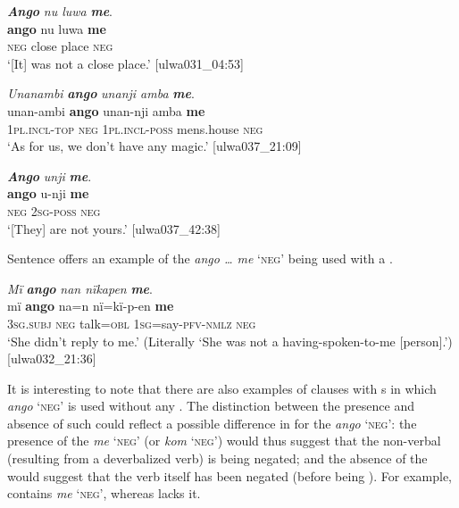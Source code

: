 \newpage

\ea%
    \label{ex:syntax:144}
          \textbf{\textit{Ango}} \textit{nu luwa} \textbf{\textit{me}}.\\
\gll \textbf{ango}  nu    luwa  \textbf{me}\\
    \textsc{neg}  close  place  \textsc{neg}\\
\glt `[It] was not a close place.’ [ulwa031\_04:53]
\z

\ea%
    \label{ex:syntax:145}
          \textit{Unanambi} \textbf{\textit{ango}} \textit{unanji amba} \textbf{\textit{me}}.\\
\gll unan-ambi    \textbf{ango}  unan-nji      amba      \textbf{me}\\
    1\textsc{pl.incl-top}  \textsc{neg}  \textsc{1pl.incl-poss}    mens.house  \textsc{neg}\\
\glt `As for us, we don’t have any magic.’ [ulwa037\_21:09]
\z

\ea%
    \label{ex:syntax:146}
          \textbf{\textit{Ango}} \textit{unji} \textbf{\textit{me}}.\\
\gll \textbf{ango}  u-nji    \textbf{me}\\
    \textsc{neg}  2\textsc{sg-poss}  \textsc{neg}\\
\glt `[They] are not yours.’ [ulwa037\_42:38]
\z

Sentence  offers an example of the  \textit{ango … me} ‘\textsc{neg}’ being used with a .

\ea%
    \label{ex:syntax:147}
          \textit{Mï} \textbf{\textit{ango}} \textit{nan nïkapen} \textbf{\textit{me}}.\\
\gll mï      \textbf{ango}  na=n    nï=kï-p-en        \textbf{me}\\
    3\textsc{sg.subj}  \textsc{neg}  talk=\textsc{obl}  \textsc{1sg}=say-\textsc{pfv-nmlz}  \textsc{neg}\\
\glt `She didn’t reply to me.’ (Literally ‘She was not a having-spoken-to-me [person].’) [ulwa032\_21:36]
\z

It is interesting to note that there are also examples of clauses with s in which \textit{ango} ‘\textsc{neg}’ is used without any . The distinction between the presence and absence of such  could reflect a possible difference in  for the  \textit{ango} ‘\textsc{neg’}: the presence of the  \textit{me} ‘\textsc{neg’} (or \textit{kom} ‘\textsc{neg’}) would thus suggest that the non-verbal  (resulting from a  deverbalized verb) is being negated; and the absence of the  would suggest that the verb itself has been negated (before being ). For example,  contains \textit{me} \textsc{‘neg’}, whereas  lacks it.

